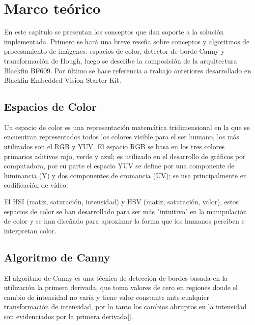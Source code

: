 \chapter{Marco teórico}

\label{ch:marco}

En este capitulo se presentan los conceptos que dan soporte a la solución implementada. Primero se hará una breve reseña sobre conceptos y algoritmos de procesamiento de imágenes: espacios de color, detector de borde Canny y transformación de Hough, luego se describe la composición de la arquitectura Blackfin BF609. Por último se hace referencia a trabajo anteriores desarrollado en Blackfin Embedded Vision Starter Kit.  

\section{Espacios de Color}

Un espacio de color es una representación matemática tridimensional en la que se encuentran representados todos los colores visible para el ser humano, los más utilizados son el RGB y YUV. El espacio RGB se basa en los tres colores primarios aditivos rojo, verde y azul; es utilizado en el desarrollo de gráficos por computadora, por su parte el espacio YUV se define por una componente de luminancia (Y) y dos componentes de cromancia (UV); se usa principalmente en codificación de vídeo.  

El HSI (matiz, saturación, intensidad) y HSV (matiz, saturación, valor), estos espacios de color se han desarrollado para ser más "intuitivo" en la manipulación de color y se han diseñado para aproximar la forma que los humanos perciben e interpretan color. 

\subsection{}






\section{Algoritmo de Canny}

El algoritmo de Canny es una técnica de detección de bordes basada en la utilización la primera derivada, que toma valores de cero en regiones donde el cambio de intensidad no varía y tiene valor constante ante cualquier transformación de intensidad, por lo tanto los cambios abruptos en la intensidad son evidenciados por la primera derivada[].

